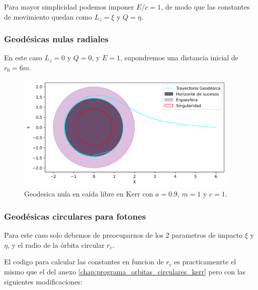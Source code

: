 Para mayor simplicidad podemos imponer $E/c = 1$, de modo que las constantes de movimiento quedan como $L_z = \xi$ y $Q = \eta$.
\subsubsection{Geodésicas nulas radiales}
En este caso $L_z = 0$ y $Q = 0$, y $E = 1$, supondremos una distancia inicial de $r_0 = 6m$.
\begin{figure}[H]
    \begin{small}
        \begin{center}
            \includegraphics[width=0.95\textwidth]{AgujerosNegros/kerr/geodesics_plots/geodesica_foton_caida_planoxy.png}
        \end{center}
        \caption{Geodesica nula en caída libre en Kerr con $a = 0.9$, $m=1$ y $c=1$.}
    \end{small}
\end{figure}

\subsubsection{Geodésicas circulares para fotones}
Para este caso solo debemos de preocuparnos de los 2 parametros de impacto $\xi$ y $\eta$, y el radio de la órbita circular $r_c$.

El codigo para calcular las constantes en funcion de $r_c$ es practicamenrte el mismo que el del anexo \ref{chap:programa_orbitas_circulares_kerr} pero con las siguientes modificaciones:


